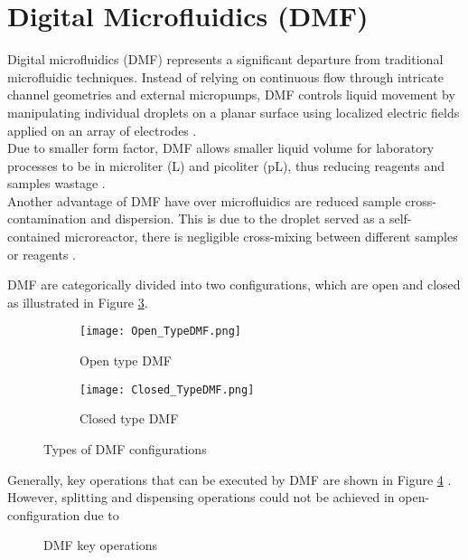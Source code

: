 \section{Digital Microfluidics (DMF)}
Digital microfluidics (DMF) represents a significant departure from traditional microfluidic techniques. Instead of relying on continuous flow through intricate channel geometries and external micropumps, DMF controls liquid movement by manipulating individual droplets on a planar surface using localized electric fields applied on an array of electrodes \cite{abdelgawadDigitalRevolutionNew2009,fairChemicalBiologicalApplications2007}.\\

Due to smaller form factor, DMF allows smaller liquid volume for laboratory processes to be in microliter (\textmugreek L) and picoliter (pL), thus reducing reagents and samples wastage \cite{bhattacharjeeDropletPositionControl2010,royNewSamplePreparation2015}.\\

Another advantage of DMF have over microfluidics are reduced sample cross-contamination and dispersion. This is due to the droplet served as a self-contained microreactor, there is negligible cross-mixing between different samples or reagents \cite{luoMachineVisionbasedDriving2021,wuResearchProgressElectrode2023}.\newpage

DMF are categorically divided into two configurations, which are open and closed as illustrated in Figure \ref{DMFConfig}.\\
\begin{figure}[h!]
    \centering
    \begin{subfigure}{0.45\textwidth}
        \centering
        \texttt{[image: Open\_TypeDMF.png]}
        \caption{Open type DMF}
        \label{OpenTypeDMF}
    \end{subfigure}
    \begin{subfigure}{0.45\textwidth}
        \centering
        \texttt{[image: Closed\_TypeDMF.png]}
        \caption{Closed type DMF}
        \label{ClosedTypeDMF}
    \end{subfigure}
    \caption{Types of DMF configurations}
    \label{DMFConfig}
\end{figure}

Generally, key operations that can be executed by DMF are shown in Figure \ref{DMFOps} \cite{bhattacharjeeMultipleDilutionSample2012,bhattacharjeeEfficientGenerationDilution2019,bhattacharyaAlgorithmicChallengesDigital2014}. However, splitting and dispensing operations could not be achieved in open-configuration due to
\begin{figure}[h!]
    \centering
    \caption{DMF key operations}
    \label{DMFOps}
\end{figure}
